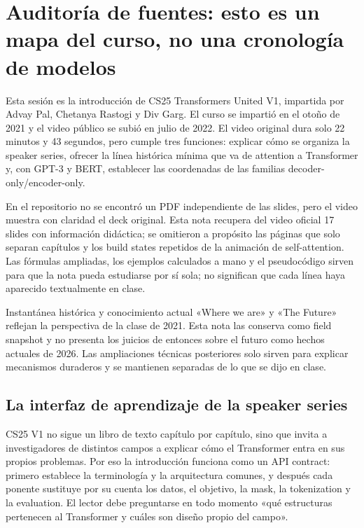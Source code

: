 \documentclass[a4paper]{article}
\begin{document}
\makecscover

\section{Auditoría de fuentes: esto es un mapa del curso, no una cronología de modelos}

Esta sesión es la introducción de CS25 Transformers United V1, impartida por Advay Pal, Chetanya Rastogi y Div Garg. El curso se impartió en el otoño de 2021 y el video público se subió en julio de 2022. El video original dura solo 22 minutos y 43 segundos, pero cumple tres funciones: explicar cómo se organiza la speaker series, ofrecer la línea histórica mínima que va de attention a Transformer y, con GPT-3 y BERT, establecer las coordenadas de las familias decoder-only/encoder-only.

En el repositorio no se encontró un PDF independiente de las slides, pero el video muestra con claridad el deck original. Esta nota recupera del video oficial 17 slides con información didáctica; se omitieron a propósito las páginas que solo separan capítulos y los build states repetidos de la animación de self-attention. Las fórmulas ampliadas, los ejemplos calculados a mano y el pseudocódigo sirven para que la nota pueda estudiarse por sí sola; no significan que cada línea haya aparecido textualmente en clase.

\begin{warningbox}{Instantánea histórica y conocimiento actual}
«Where we are» y «The Future» reflejan la perspectiva de la clase de 2021. Esta nota las conserva como field snapshot y no presenta los juicios de entonces sobre el futuro como hechos actuales de 2026. Las ampliaciones técnicas posteriores solo sirven para explicar mecanismos duraderos y se mantienen separadas de lo que se dijo en clase.
\end{warningbox}

\subsection{La interfaz de aprendizaje de la speaker series}

CS25 V1 no sigue un libro de texto capítulo por capítulo, sino que invita a investigadores de distintos campos a explicar cómo el Transformer entra en sus propios problemas. Por eso la introducción funciona como un API contract: primero establece la terminología y la arquitectura comunes, y después cada ponente sustituye por su cuenta los datos, el objetivo, la mask, la tokenization y la evaluation. El lector debe preguntarse en todo momento «qué estructuras pertenecen al Transformer y cuáles son diseño propio del campo».
\end{document}
